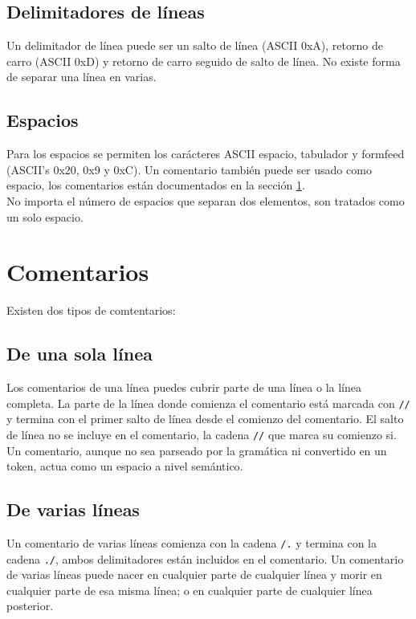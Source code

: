 \documentclass[12pt, spanish]{report}
\begin{document}
\subsection{Delimitadores de l\'ineas}
\label{sec:line_terms}
Un delimitador de l\'inea puede ser un salto de l\'inea (ASCII 0xA),
retorno de carro (ASCII 0xD) y retorno de carro seguido de
salto de l\'inea. No existe forma de separar una l\'inea en varias.

\subsection{Espacios}
\label{sec:spaces}
Para los espacios se permiten los car\'acteres ASCII espacio,
tabulador y formfeed (ASCII's 0x20, 0x9 y 0xC). Un comentario
tambi\'en puede ser usado como espacio, los comentarios est\'an
documentados en la secci\'on \ref{sec:comments}.\\
\indent No importa el n\'umero de espacios que separan dos elementos,
son tratados como un solo espacio.

\section{Comentarios}
\label{sec:comments}
Existen dos tipos de comtentarios:

\subsection{De una sola l\'inea}
Los comentarios de una l\'inea puedes cubrir parte de una l\'inea
o la l\'inea completa. La parte de la l\'inea donde comienza el
comentario est\'a marcada con \texttt{//} y termina con el
primer salto de l\'inea desde el comienzo del comentario. El salto de
l\'inea no se incluye en el comentario, la cadena \texttt{//} que marca su
comienzo si.\\
\indent Un comentario, aunque no sea parseado por la gram\'atica ni
convertido en un token, actua como un espacio a nivel sem\'antico.

\subsection{De varias l\'ineas}
Un comentario de varias l\'ineas comienza con la cadena \texttt{/.} y
termina con la cadena \texttt{./}, ambos delimitadores est\'an incluidos
en el comentario. Un comentario de varias l\'ineas puede nacer en cualquier parte
de cualquier l\'inea y morir en cualquier parte de esa misma l\'inea;
o en cualquier parte de cualquier l\'inea posterior.
\end{document}
